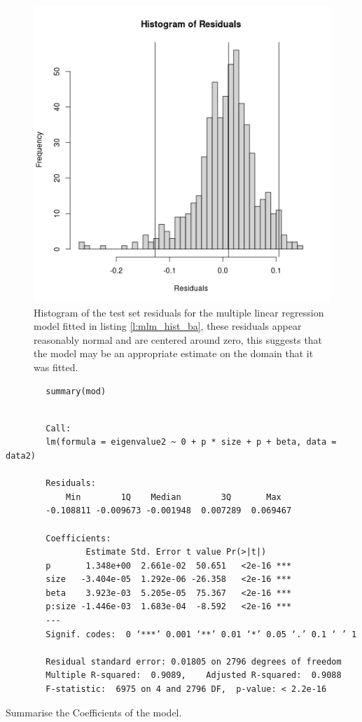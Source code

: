 \documentclass[11pt]{report}
\begin{document}
\begin{figure}[htbp]
\centering
\includegraphics[width=12cm]{media/ba_hist_mlm_mod.png}
\caption{\label{fig:mlm_hist_ba}Histogram of the test set residuals for the multiple linear regression model fitted in listing \ref{l:mlm_hist_ba}, these residuals appear reasonably normal and are centered around zero, this suggests that the model may be an appropriate estimate on the domain that it was fitted.}
\end{figure}


\begin{listing}[htbp]
    \begin{tcolorbox}
        \begin{verbatim}
        summary(mod)
        \end{verbatim}
    \tcblower
        \begin{verbatim}

        Call:
        lm(formula = eigenvalue2 ~ 0 + p * size + p + beta, data = data2)

        Residuals:
            Min        1Q    Median        3Q       Max
        -0.108811 -0.009673 -0.001948  0.007289  0.069467

        Coefficients:
                Estimate Std. Error t value Pr(>|t|)
        p       1.348e+00  2.661e-02  50.651   <2e-16 ***
        size   -3.404e-05  1.292e-06 -26.358   <2e-16 ***
        beta    3.923e-03  5.205e-05  75.367   <2e-16 ***
        p:size -1.446e-03  1.683e-04  -8.592   <2e-16 ***
        ---
        Signif. codes:  0 ‘***’ 0.001 ‘**’ 0.01 ‘*’ 0.05 ‘.’ 0.1 ‘ ’ 1

        Residual standard error: 0.01805 on 2796 degrees of freedom
        Multiple R-squared:  0.9089,	Adjusted R-squared:  0.9088
        F-statistic:  6975 on 4 and 2796 DF,  p-value: < 2.2e-16
        \end{verbatim}
    \end{tcolorbox}
\caption{\label{mod_summary}Summarise the Coefficients of the model.}
\end{listing}
\end{document}
